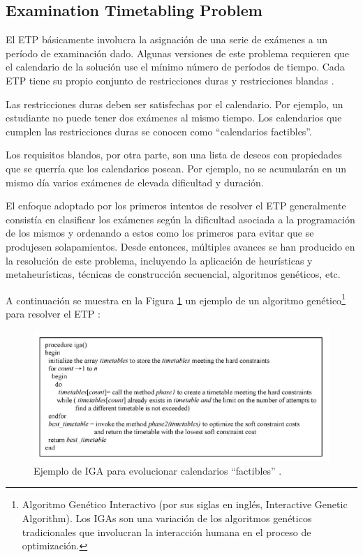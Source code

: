 \subsection{Examination Timetabling Problem}
El ETP básicamente involucra la asignación de una serie de exámenes a un período de examinación dado. Algunas versiones de este problema requieren que el calendario de la solución use el mínimo número de períodos de tiempo. Cada ETP tiene su propio conjunto de restricciones duras y restricciones blandas \cite{AutomatedTimetabling,NAJIAZIMI2005705}.\newline

Las restricciones duras deben ser satisfechas por el calendario. Por ejemplo, un estudiante no puede tener dos exámenes al mismo tiempo. Los calendarios que cumplen las restricciones duras se conocen como ``calendarios factibles''.\newline

Los requisitos blandos, por otra parte, son una lista de deseos con propiedades que se querría que los calendarios posean. Por ejemplo, no se acumularán en un mismo día varios exámenes de elevada dificultad y duración.\newline

El enfoque adoptado por los primeros intentos de resolver el ETP generalmente consistía en clasificar los exámenes según la dificultad asociada a la programación de los mismos y ordenando a estos como los primeros para evitar que se produjesen solapamientos. Desde entonces, múltiples avances se han producido en la resolución de este problema, incluyendo la aplicación de heurísticas y metaheurísticas, técnicas de construcción secuencial, algoritmos genéticos, etc.

A continuación se muestra en la Figura \ref{fig:IGA_ETP} un ejemplo de un algoritmo genético\footnote{Algoritmo Genético Interactivo (por sus siglas en inglés, Interactive Genetic Algorithm). Los IGAs son una variación de los algoritmos genéticos tradicionales que involucran la interacción humana en el proceso de optimización.} para resolver el ETP \cite{PILLAY2010457}:

\begin{figure}[H]
    \centering
    \includegraphics[width=1\textwidth]{./imagenes/IGA_ETP.png}
    \caption{Ejemplo de IGA para evolucionar calendarios ``factibles'' \cite{PILLAY2010457}.}
    \label{fig:IGA_ETP}
\end{figure}

